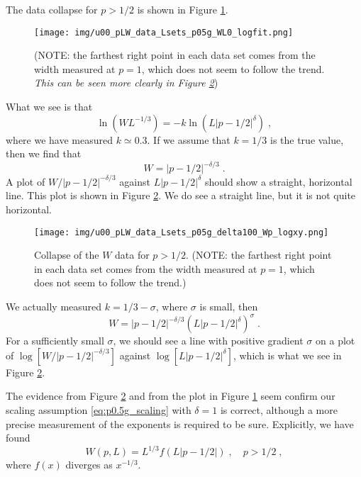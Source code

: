 \documentclass[a4paper,10pt]{article}
\newcommand{\fref}[1]{Figure \ref{#1}}
\begin{document}
The data collapse for $p>1/2$ is shown in \fref{fig:p05g_logfit}. 
\begin{figure}[h!]
  \centering
  \texttt{[image: img/u00\_pLW\_data\_Lsets\_p05g\_WL0\_logfit.png]} 
  \caption{(NOTE: the farthest right point in each data set comes from the width measured at $p=1$, which does not seem to follow the trend. \emph{This can be seen more clearly in \fref{fig:p05g_delta100_Wp}})}
  \label{fig:p05g_logfit}
\end{figure}
What we see is that 
\begin{equation}
 \ln(WL^{-1/3}) = -k \ln (L|p-1/2|^\delta) \;,  
\end{equation}
where we have measured $k \simeq 0.3$. If we assume that $k=1/3$ is the true value, then we find that
\begin{equation}
  W = |p-1/2|^{-\delta/3} \;.
\end{equation}
A plot of $W/|p-1/2|^{-\delta/3}$ against $L|p-1/2|^\delta$ should show a straight, horizontal line. This plot is shown in \fref{fig:p05g_delta100_Wp}. We do see a straight line, but it is not quite horizontal.
\begin{figure}
  \centering
  \texttt{[image: img/u00\_pLW\_data\_Lsets\_p05g\_delta100\_Wp\_logxy.png]} 
  \caption{Collapse of the $W$ data for $p > 1/2$. (NOTE: the farthest right point in each data set comes from the width measured at $p=1$, which does not seem to follow the trend.)}
  \label{fig:p05g_delta100_Wp}
\end{figure}

We actually measured $k = 1/3 - \sigma$, where $\sigma$ is small, then 
\begin{equation}
  W = |p-1/2|^{-\delta/3} (L|p-1/2|^\delta)^{\sigma}\;.
\end{equation}
For a sufficiently small $\sigma$, we should see a line with positive gradient $\sigma$ on a plot of $\log[W/|p-1/2|^{-\delta/3}]$ against $\log[L|p-1/2|^\delta]$, which is what we see in \fref{fig:p05g_delta100_Wp}.

The evidence from \fref{fig:p05g_delta100_Wp} and from the plot in \fref{fig:p05g_logfit} seem confirm our scaling assumption \eqref{eq:p0.5g_scaling} with $\delta = 1$ is correct, although a more precise measurement of the exponents is required to be sure. Explicitly, we have found
\begin{equation}
 W(p,L) = L^{1/3} f(L|p-1/2|) \;, \quad p > 1/2 \;, 
\end{equation}
where $f(x)$ diverges as $x^{-1/3}$.
\end{document}

